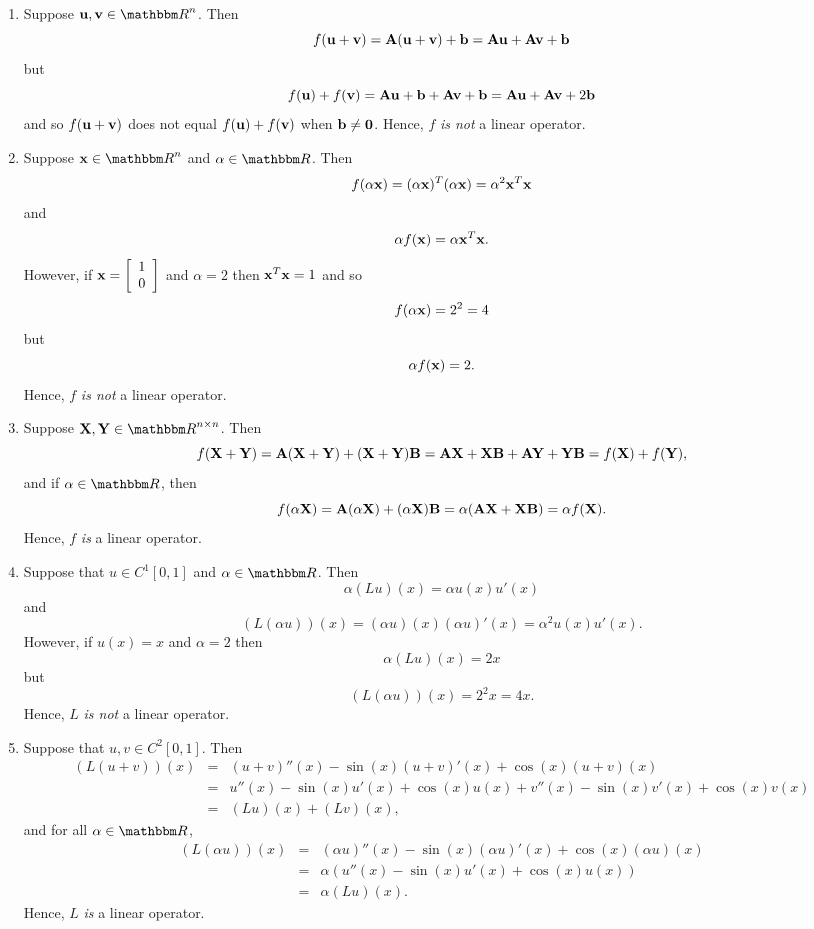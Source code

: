 \begin{solution}
\begin{enumerate}
\item  Suppose $\Bu, \Bv \in \Rn$.  Then 
\[
f({\bf u}+{\bf v}) = {\bf A}({\bf u}+{\bf v}) + {\bf b}  = {\bf A}{\bf u} + {\bf A}{\bf v} + {\bf b}
\]
but
\[
f({\bf u})+f({\bf v}) = {\bf A}{\bf u} + {\bf b} + {\bf A}{\bf v} + {\bf b} = {\bf A}{\bf u} + {\bf A}{\bf v} + 2{\bf b}
\]
and so $f({\bf u}+{\bf v})$ does not equal $f({\bf u}) + f({\bf v})$ when ${\bf b}\ne {\bf 0}$. Hence, $f$ \emph{is not} a linear operator.
\\
\item Suppose $\Bx\in \Rn$ and $\alpha\in\R$. Then 
\[
f(\alpha{\bf x}) = (\alpha {\bf x})^T(\alpha {\bf x}) = \alpha^2 {\bf x}^T{\bf x}
\]
and 
\[
\alpha f({\bf x}) = \alpha {\bf x}^T{\bf x}.
\]
However, if $\displaystyle{{\bf x}= \left[\begin{array}{c}1\\ 0\end{array}\right]}$ and $\alpha=2$ then ${\bf x}^T{\bf x}=1$ and so
\[
f(\alpha{\bf x}) = 2^2=4
\]
but
\[
\alpha f({\bf x}) = 2.
\]
Hence, $f$ \emph{is not} a linear operator.
\\
\item Suppose $\BX, \BY \in \Rnn$. Then 
\[
f({\bf X}+{\bf Y}) = {\bf A}({\bf X}+{\bf Y}) + ({\bf X}+{\bf Y}){\bf B} = {\bf A}{\bf X} + {\bf X} {\bf B} + {\bf A}{\bf Y} + {\bf Y}{\bf B} = f({\bf X}) + f({\bf Y}),
\]
and if $\alpha\in\R$, then
\[
f(\alpha {\bf X}) = {\bf A}(\alpha{\bf X}) + (\alpha {\bf X}) {\bf B} = \alpha ({\bf A}{\bf X} + {\bf X}{\bf B}) = \alpha f({\bf X}).
\]
Hence, $f$ \emph{is} a linear operator.
\\
\item Suppose that $u \in C^1[0,1]$ and $\alpha \in \R$. Then 
\[
\alpha(Lu)(x) = \alpha u(x) u'(x)
\]
and
\[
(L(\alpha u))(x) = (\alpha u)(x) (\alpha u)'(x)=\alpha^2u(x) u'(x).
\]
However, if $u(x) = x$ and $\alpha=2$ then
\[
\alpha(Lu)(x) = 2x
\]
but
\[
(L(\alpha u))(x) = 2^2 x=4x.
\]
Hence, $L$ \emph{is not} a linear operator.
\\
\item Suppose that $u, v \in C^2[0,1]$. Then 
\begin{eqnarray*}
(L(u+v))(x) &=& (u+v)''(x) - \sin(x) (u+v)'(x) + \cos(x) (u+v)(x)
\\
&=& u''(x) - \sin(x) u'(x) + \cos(x) u(x) + v''(x) - \sin(x) v'(x) + \cos(x) v(x)
\\
&=& (Lu)(x) + (Lv)(x),
\end{eqnarray*}
and for all $\alpha \in \R$,
\begin{eqnarray*}
(L(\alpha u))(x) &=& (\alpha u)''(x) - \sin(x) (\alpha u)'(x) + \cos(x) (\alpha u)(x)
\\
&=& \alpha \left(u''(x) - \sin(x) u'(x) + \cos(x) u(x)\right)
\\
&=& \alpha (Lu)(x).
\end{eqnarray*}
Hence, $L$ \emph{is} a linear operator.
\end{enumerate}
\end{solution}